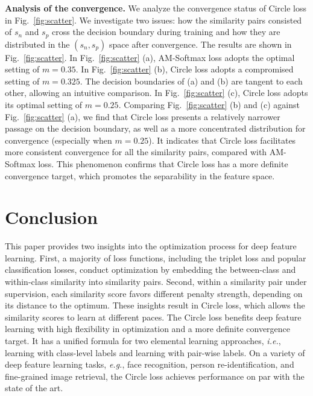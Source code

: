 \documentclass[10pt,twocolumn,letterpaper]{article}
\begin{document}
\textbf{Analysis of the convergence.}\quad
We analyze the convergence status of Circle loss in Fig.~\ref{fig:scatter}.
We investigate two issues: how the similarity pairs consisted of $s_n$ and $s_p$ cross the decision boundary during training and how they are distributed in the $(s_n, s_p)$ space after convergence. The results are shown in Fig.~\ref{fig:scatter}. In Fig.~\ref{fig:scatter} (a), AM-Softmax loss adopts the optimal setting of $m=0.35$. In Fig.~\ref{fig:scatter} (b), Circle loss adopts a compromised setting of $m=0.325$. The decision boundaries of (a) and (b) are tangent to each other, allowing an intuitive comparison. In Fig.~\ref{fig:scatter} (c), Circle loss adopts its optimal setting of $m=0.25$. Comparing Fig.~\ref{fig:scatter} (b) and (c) against Fig.~\ref{fig:scatter} (a), we find that Circle loss presents a relatively narrower passage on the decision boundary, as well as a more concentrated distribution for convergence (especially when $m=0.25$). It indicates that Circle loss facilitates more consistent convergence for all the similarity pairs, compared with AM-Softmax loss. 
This phenomenon confirms that Circle loss has a more definite convergence target, which promotes the separability in the feature space.

\section{Conclusion}
This paper provides two insights into the optimization process for deep feature learning. First, a majority of loss functions, including the triplet loss and popular classification losses, conduct optimization by embedding the between-class and within-class similarity into similarity pairs. Second, within a similarity pair under supervision, each similarity score favors different penalty strength, depending on its distance to the optimum. These insights result in Circle loss, which allows the similarity scores to learn at different paces. The Circle loss benefits deep feature learning with high flexibility in optimization and a more definite convergence target. It has a unified formula for two elemental learning approaches, \emph{i.e.}, learning with class-level labels and learning with pair-wise labels. On a variety of deep feature learning tasks, \emph{e.g.}, face recognition, person re-identification, and fine-grained image retrieval, the Circle loss achieves performance on par with the state of the art. 


{\small


}


 
 
\vspace{0.5em}
\end{document}
